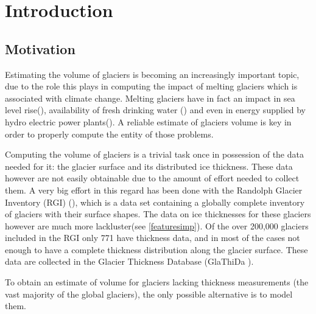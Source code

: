 \chapter{Introduction}\label{chap1}
\thispagestyle{plain}

\section{Motivation}\label{motivation}
Estimating the volume of glaciers is becoming an increasingly important topic, due to the role this plays in computing the impact of melting glaciers which is associated with climate change. Melting glaciers have in fact an impact in sea level rise(\citet{Zemp2017}), availability of fresh drinking water (\citet{Kaser2010}) and even in energy supplied by hydro electric power plants(\citet{Terrier2011}). A reliable estimate of glaciers volume is key in order to properly compute the entity of those problems.

Computing the volume of glaciers is a trivial task once in possession of the data needed for it: the glacier surface and its distributed ice thickness. These data however are not easily obtainable due to the amount of effort needed to collect them. A very big effort in this regard has been done with the Randolph Glacier Inventory (RGI) (\citet{RGI2014}), which is a data set containing a globally complete inventory of glaciers with their surface shapes. The data on ice thicknesses for these glaciers however are much more lackluster(see \ref{featuresimp}). Of the over 200,000 glaciers included in the RGI only 771 have thickness data, and in most of the cases not enough to have a complete thickness distribution along the glacier surface. These data are collected in the Glacier Thickness Database (GlaThiDa \citet{GlaThiDa2014}).

To obtain an estimate of volume for glaciers lacking thickness measurements (the vast majority of the global glaciers), the only possible alternative is to model them.
  

